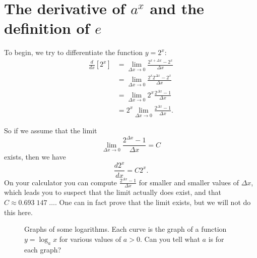 \section{The derivative of $a^x$ and the definition of $e$} %
To begin, we try to differentiate the function $y=2^x$:
\begin{align*}
  \frac{d}{dx}\left[ 2^x \right]
  & = \lim_{\Delta x\to0}\frac{2^{x+\Delta x}-2^x}{\Delta x} \\
  & = \lim_{\Delta x\to0}\frac{2^{x}2^{\Delta x}-2^x}{\Delta x} \\
  & = \lim_{\Delta x\to0}2^x\frac{2^{\Delta x}-1}{\Delta x} \\
  & = 2^x \lim_{\Delta x\to0}\frac{2^{\Delta x}-1}{\Delta x}.
\end{align*}




So if we assume that the limit
\[
\lim_{\Delta x\to0}\frac{2^{\Delta x}-1}{\Delta x}=C
\]
exists, then we have
\begin{equation}
  \label{eq:derivativeof2x}
  \frac{d 2^x}{dx} = C 2^x.
\end{equation}
On your calculator you can compute $\frac{2^{\Delta x}-1}{\Delta x}$
for smaller and smaller values of $\Delta x$, which leads you to
suspect that the limit actually does exist, and that $C\approx
0.693\;147\;\ldots$. One can in fact prove that the limit exists, but
we will not do this here.




\begin{figure}[!t]\centering
  
  \caption{Graphs of some logarithms.  Each curve is the graph of a
    function $y=\log_a x$ for various values of $a>0$.  Can you tell
    what $a$ is for each graph?}
  \label{fig:07logplot}
\end{figure}








